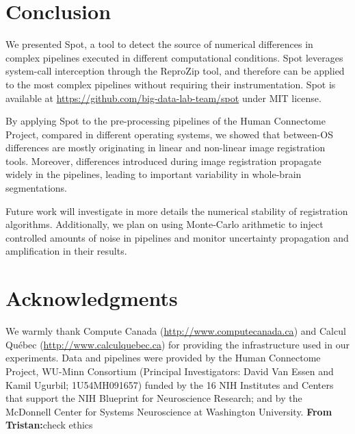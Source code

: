 \documentclass[a4paper,num-refs]{oup-contemporary}
\newcommand{\reprozip}[0]{ReproZip\xspace}
\newcommand{\tristan}[1]{\color{orange}\textbf{From Tristan:}#1\color{black}}
\newcommand{\toolname}[0]{Spot\xspace}
\begin{document}
\section{Conclusion}

We presented \toolname, a tool to detect the source of numerical
differences in complex pipelines executed in different computational
conditions. \toolname leverages system-call interception through the
\reprozip tool, and therefore can be applied to the most complex pipelines
without requiring their instrumentation. \toolname is available at \url{https://github.com/big-data-lab-team/spot} under MIT license.

By applying \toolname to the pre-processing pipelines of the Human
Connectome Project, compared in different operating systems, we showed that
between-OS differences are mostly originating in linear and non-linear
image registration tools. Moreover, differences introduced during image
registration propagate widely in the pipelines, leading to important
variability in whole-brain segmentations.

Future work will investigate in more details the numerical stability of
registration algorithms. Additionally, we plan on using Monte-Carlo arithmetic
to inject controlled amounts of noise in pipelines and monitor
uncertainty propagation and amplification in their results.

\section{Acknowledgments}

We warmly thank Compute Canada (\url{http://www.computecanada.ca}) and Calcul
Qu\'ebec (\url{http://www.calculquebec.ca}) for providing the infrastructure used in our experiments.
Data and pipelines were provided by the Human Connectome Project, WU-Minn 
Consortium (Principal Investigators: David Van Essen and Kamil Ugurbil; 
1U54MH091657) funded by the 16 NIH Institutes and Centers that support 
the NIH Blueprint for Neuroscience Research; and by the McDonnell 
Center for Systems Neuroscience at Washington University.
\tristan{check ethics}



\end{document}
